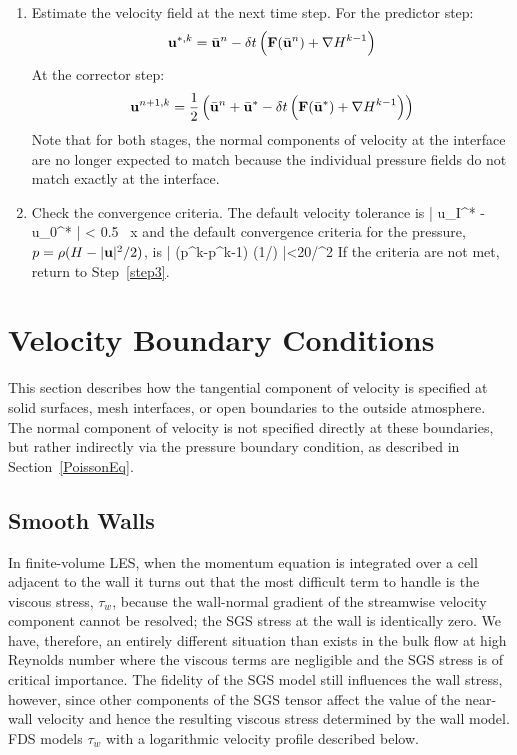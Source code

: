 \begin{enumerate}
\item Estimate the velocity field at the next time step. For the predictor step:
\begin{equation}
\label{eqn_RK1}
\mathbf{u}^{*,k} = \bar{\mathbf{u}}^n - \delta t \left( \mathbf{F}(\bar{\mathbf{u}}^n) + {\nabla H}^{k-1} \right)
\end{equation}
At the corrector step:
\begin{equation}
\label{eqn_RK2}
\mathbf{u}^{n+1,k} = \frac{1}{2} \left( \bar{\mathbf{u}}^n + \bar{\mathbf{u}}^* - \delta t \left( \mathbf{F}(\bar{\mathbf{u}}^*) + {\nabla H}^{k-1} \right) \right)
\end{equation}
Note that for both stages, the normal components of velocity at the interface are no longer expected to match because the individual pressure fields do not match exactly at the interface.

\item Check the convergence criteria. The default velocity tolerance is
   \be
      \left| u_I^* - u_0^* \right| < 0.5 \, \delta x
   \ee
    and the default convergence criteria for the pressure, $p=\rho(H-|{\mathbf{u}}|^2/2)$, is
   \be
      \left| \nabla \cdot (p^k-p^{k-1}) \nabla (1/\rho) \right|<20/\dx^2
   \ee
   If the criteria are not met, return to Step~\ref{step3}.
\end{enumerate}




\newpage
\section{Velocity Boundary Conditions}
\label{info:velocity_bc}

This section describes how the tangential component of velocity is specified at solid surfaces, mesh interfaces, or open boundaries to the outside atmosphere. The normal component of velocity is not specified directly at these boundaries, but rather indirectly via the pressure boundary condition, as described in Section~\ref{PoissonEq}.

\subsection{Smooth Walls}
\label{smooth_wall_model}

In finite-volume LES, when the momentum equation is integrated over a cell adjacent to the wall it turns out that the most difficult term to handle is the viscous stress, $\tau_w$, because the wall-normal gradient of the streamwise velocity component cannot be resolved; the SGS stress at the wall is identically zero.  We have, therefore, an entirely different situation than exists in the bulk flow at high Reynolds number where the viscous terms are negligible and the SGS stress is of critical importance.  The fidelity of the SGS model still influences the wall stress, however, since other components of the SGS tensor affect the value of the near-wall velocity and hence the resulting viscous stress determined by the wall model. FDS models $\tau_w$ with a logarithmic velocity profile \cite{Pope:2000} described below.

